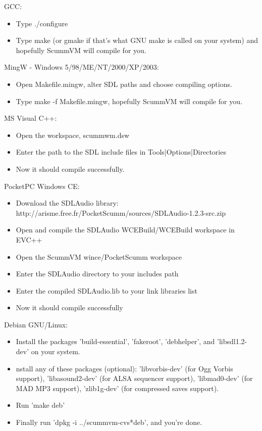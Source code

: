 GCC:
  \begin{itemize}
  \item Type ./configure
  \item Type make (or gmake if that's what GNU make is called on your
        system) and hopefully ScummVM will compile for you.
  \end{itemize}
MingW -  Windows 5/98/ME/NT/2000/XP/2003:
  \begin{itemize}
  \item Open Makefile.mingw, alter SDL paths and choose compiling
    options.
  \item Type make -f Makefile.mingw,  hopefully ScummVM will compile for you.
  \end{itemize}
MS Visual C++:
  \begin{itemize}
  \item Open the workspace, scummwm.dsw
  \item Enter the path to the SDL include files in
    Tools|Options|Directories
  \item Now it should compile successfully. 
  \end{itemize}
PocketPC Windows CE:
  \begin{itemize}
  \item Download the SDLAudio library:\\
    http://arisme.free.fr/PocketScumm/sources/SDLAudio-1.2.3-src.zip
  \item Open and compile the SDLAudio WCEBuild/WCEBuild workspace in
    EVC++
  \item Open the ScummVM wince/PocketScumm workspace
  \item Enter the SDLAudio directory to your includes path
  \item Enter the compiled SDLAudio.lib to your link libraries list
  \item Now it should compile successfully
  \end{itemize}
Debian GNU/Linux:
  \begin{itemize}
  \item Install the packages 'build-essential', 'fakeroot', 'debhelper',
          and 'libsdl1.2-dev' on your system.
  \item nstall any of these packages (optional): 'libvorbis-dev' (for Ogg
          Vorbis support), 'libasound2-dev' (for ALSA sequencer support),
          'libmad0-dev' (for MAD MP3 support), 'zlib1g-dev' (for compressed
          saves support).
  \item Run 'make deb'
  \item Finally run 'dpkg -i ../scummvm-cvs*deb', and you're done.
  \end{itemize}

